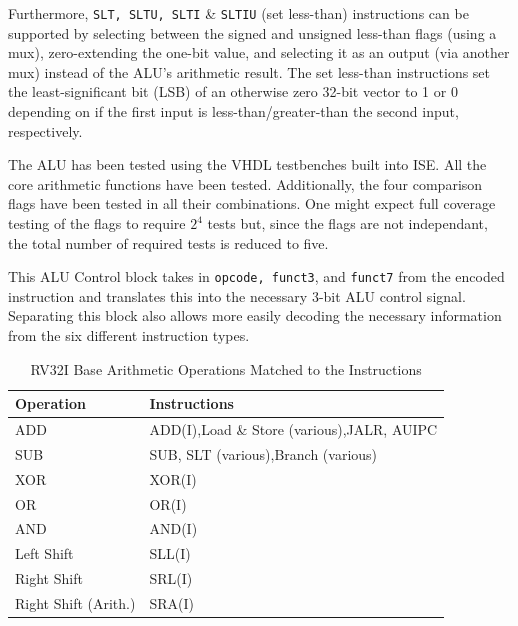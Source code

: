 \documentclass[lettersize,journal]{IEEEtran}
\begin{document}
Furthermore, \verb|SLT, SLTU, SLTI| \& \verb|SLTIU| (set less-than) instructions can be supported by selecting between the signed and unsigned less-than flags (using a mux), zero-extending the one-bit value, and selecting it as an output (via another mux) instead of the ALU's arithmetic result.
The set less-than instructions set the least-significant bit (LSB) of an otherwise zero 32-bit vector to 1 or 0 depending on if the first input is less-than/greater-than the second input, respectively.

The ALU has been tested using the VHDL testbenches built into ISE.
All the core arithmetic functions have been tested.
Additionally, the four comparison flags have been tested in all their combinations.
One might expect full coverage testing of the flags to require $2^{4}$ tests but, since the flags are not independant, the total number of required tests is reduced to five.

This ALU Control block takes in \verb|opcode, funct3|, and \verb|funct7| from the encoded instruction and translates this into the necessary 3-bit ALU control signal.
Separating this block also allows more easily decoding the necessary information from the six different \cite{riscvunprovisioned} instruction types.
\begin{table}
    \label{table:ALUOps}
    \centering
    \begin{tabular}{|p{2.7cm}|p{4cm}|}
        \hline
        Operation & Instructions \\
        \hline\hline
        ADD & ADD(I),\newline Load \& Store (various),\newline JALR, AUIPC\\
        SUB & SUB, SLT (various),\newline Branch (various)\\
        XOR & XOR(I)\\
        OR & OR(I)\\
        AND & AND(I)\\
        Left Shift & SLL(I)\\
        Right Shift & SRL(I)\\
        Right Shift (Arith.) & SRA(I)\\
        \hline
    \end{tabular}
    \vspace{4pt}
    \caption{RV32I Base Arithmetic Operations Matched to the Instructions}
\end{table}
\end{document}
